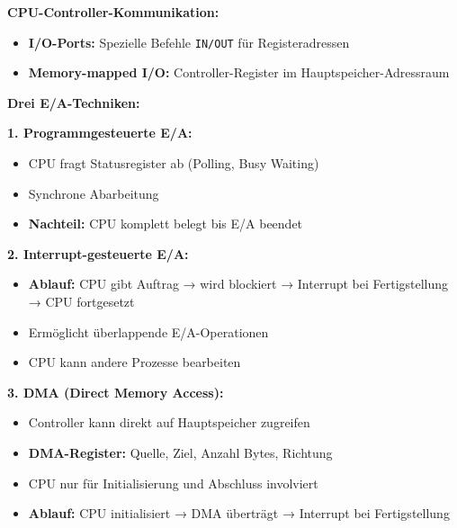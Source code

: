 \documentclass[9pt,a4paper]{extarticle}
\begin{document}
\begin{multicols*}{2}
\textbf{CPU-Controller-Kommunikation:}
\begin{itemize}
\item \textbf{I/O-Ports:} Spezielle Befehle \texttt{IN/OUT} für Registeradressen
\item \textbf{Memory-mapped I/O:} Controller-Register im Hauptspeicher-Adressraum
\end{itemize}

\textbf{Drei E/A-Techniken:}

\textbf{1. Programmgesteuerte E/A:}
\begin{itemize}
\item CPU fragt Statusregister ab (Polling, Busy Waiting)
\item Synchrone Abarbeitung
\item \textbf{Nachteil:} CPU komplett belegt bis E/A beendet
\end{itemize}

\textbf{2. Interrupt-gesteuerte E/A:}
\begin{itemize}
\item \textbf{Ablauf:} CPU gibt Auftrag → wird blockiert → Interrupt bei Fertigstellung → CPU fortgesetzt
\item Ermöglicht überlappende E/A-Operationen
\item CPU kann andere Prozesse bearbeiten
\end{itemize}

\textbf{3. DMA (Direct Memory Access):}
\begin{itemize}
\item Controller kann direkt auf Hauptspeicher zugreifen
\item \textbf{DMA-Register:} Quelle, Ziel, Anzahl Bytes, Richtung
\item CPU nur für Initialisierung und Abschluss involviert
\item \textbf{Ablauf:} CPU initialisiert → DMA überträgt → Interrupt bei Fertigstellung
\end{itemize}


\end{multicols*}
\end{document}
